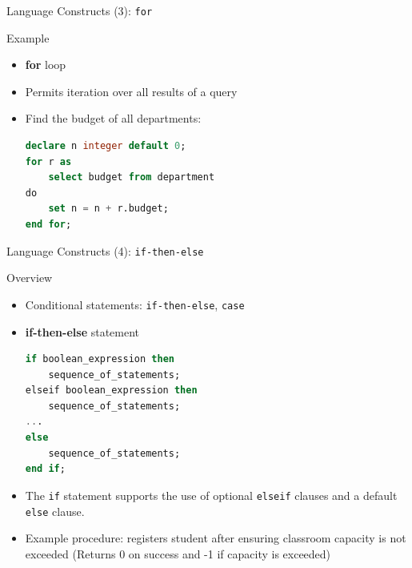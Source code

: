 \documentclass[aspectratio=169, xcolor=dvipsnames]{beamer}
\begin{document}
\begin{frame}[fragile]{Language Constructs (3): \texttt{for}}
    \begin{exampleblock}{Example}
        \begin{itemize}[<+->]
            \item \textbf{for} loop
            \item Permits iteration over all results of a query
            \item Find the budget of all departments:
            \begin{lstlisting}[language=SQL]
declare n integer default 0; 
for r as
    select budget from department
do
    set n = n + r.budget;
end for;
            \end{lstlisting}
        \end{itemize}
    \end{exampleblock}
\end{frame}

\begin{frame}[fragile]{Language Constructs (4): \texttt{if-then-else}}
    \begin{block}{Overview}
        \begin{itemize}[<+->]
            \item Conditional statements: \texttt{if-then-else}, \texttt{case}
            \item \textbf{if-then-else} statement
            \begin{lstlisting}[language=SQL, basicstyle=\ttfamily\scriptsize]
if boolean_expression then 
    sequence_of_statements; 
elseif boolean_expression then 
    sequence_of_statements;
...
else
    sequence_of_statements;
end if;
            \end{lstlisting}
            \item The \texttt{if} statement supports the use of optional \texttt{elseif} clauses and a default \texttt{else} clause.
            \item Example procedure: registers student after ensuring classroom capacity is not exceeded (Returns 0 on success and -1 if capacity is exceeded)
        \end{itemize}
    \end{block}
\end{frame}
\end{document}
